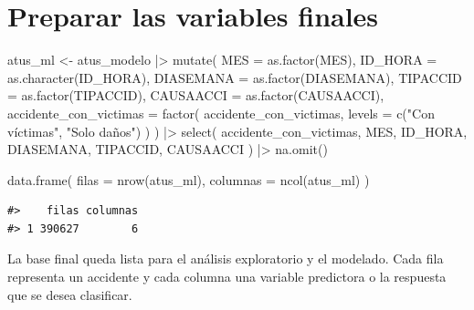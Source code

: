 \documentclass[
  spanish,
  10.5pt,
  letterpaper,
  openany,
  headings=big]{scrbook}
\newenvironment{Shaded}{}{}
\newcommand{\AttributeTok}[1]{\textcolor[rgb]{0.84,0.23,0.29}{#1}}
\newcommand{\FunctionTok}[1]{\textcolor[rgb]{0.44,0.26,0.76}{#1}}
\newcommand{\NormalTok}[1]{\textcolor[rgb]{0.14,0.16,0.18}{#1}}
\newcommand{\OtherTok}[1]{\textcolor[rgb]{0.44,0.26,0.76}{#1}}
\newcommand{\SpecialCharTok}[1]{\textcolor[rgb]{0.00,0.36,0.77}{#1}}
\newcommand{\StringTok}[1]{\textcolor[rgb]{0.01,0.18,0.38}{#1}}
\begin{document}
\section{Preparar las variables
finales}\label{preparar-las-variables-finales}

\begin{Shaded}
\begin{Highlighting}[]
\NormalTok{atus\_ml }\OtherTok{\textless{}{-}}\NormalTok{ atus\_modelo }\SpecialCharTok{|\textgreater{}}
  \FunctionTok{mutate}\NormalTok{(}
    \AttributeTok{MES =} \FunctionTok{as.factor}\NormalTok{(MES),}
    \AttributeTok{ID\_HORA =} \FunctionTok{as.character}\NormalTok{(ID\_HORA),}
    \AttributeTok{DIASEMANA =} \FunctionTok{as.factor}\NormalTok{(DIASEMANA),}
    \AttributeTok{TIPACCID =} \FunctionTok{as.factor}\NormalTok{(TIPACCID),}
    \AttributeTok{CAUSAACCI =} \FunctionTok{as.factor}\NormalTok{(CAUSAACCI),}
    \AttributeTok{accidente\_con\_victimas =} \FunctionTok{factor}\NormalTok{(}
\NormalTok{      accidente\_con\_victimas,}
      \AttributeTok{levels =} \FunctionTok{c}\NormalTok{(}\StringTok{"Con víctimas"}\NormalTok{, }\StringTok{"Solo daños"}\NormalTok{)}
\NormalTok{    )}
\NormalTok{  ) }\SpecialCharTok{|\textgreater{}}
  \FunctionTok{select}\NormalTok{(}
\NormalTok{    accidente\_con\_victimas,}
\NormalTok{    MES,}
\NormalTok{    ID\_HORA,}
\NormalTok{    DIASEMANA,}
\NormalTok{    TIPACCID,}
\NormalTok{    CAUSAACCI}
\NormalTok{  ) }\SpecialCharTok{|\textgreater{}}
  \FunctionTok{na.omit}\NormalTok{()}

\FunctionTok{data.frame}\NormalTok{(}
  \AttributeTok{filas =} \FunctionTok{nrow}\NormalTok{(atus\_ml),}
  \AttributeTok{columnas =} \FunctionTok{ncol}\NormalTok{(atus\_ml)}
\NormalTok{)}
\end{Highlighting}
\end{Shaded}

\begin{verbatim}
#>    filas columnas
#> 1 390627        6
\end{verbatim}

\begin{tcolorbox}[enhanced jigsaw, arc=.35mm, bottomrule=.15mm, bottomtitle=1mm, breakable, colback=white, colbacktitle=quarto-callout-tip-color!10!white, colframe=quarto-callout-tip-color-frame, coltitle=black, left=2mm, leftrule=.75mm, opacityback=0, opacitybacktitle=0.6, rightrule=.15mm, title=\textcolor{quarto-callout-tip-color}{\faLightbulb}\hspace{0.5em}{Interpretación}, titlerule=0mm, toprule=.15mm, toptitle=1mm]

La base final queda lista para el análisis exploratorio y el modelado.
Cada fila representa un accidente y cada columna una variable predictora
o la respuesta que se desea clasificar.

\end{tcolorbox}
\end{document}
